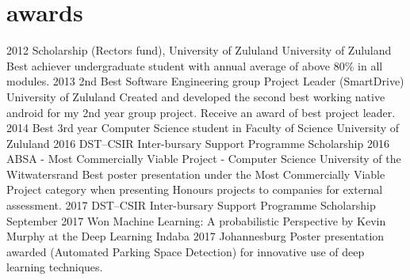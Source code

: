 \documentclass[]{friggeri-cv}
\begin{document}
\section{awards}
\begin{entrylist}
	\entry
	{2012}
	{Scholarship (Rector\textquotesingle{}s fund), University of Zululand}
	{University of Zululand}
	{Best achiever undergraduate student with annual average of above 80\% in all modules.}
	\entry
	{2013}
	{2nd Best Software Engineering group Project Leader (SmartDrive)}
	{University of Zululand}
	{Created and developed the second best working native android for my 2nd year group project. Receive an award of best project leader.}
	\entry
	{2014}
	{Best 3rd year Computer Science student in Faculty of Science}
	{University of Zululand}
	{}
	\entry
	{2016}
	{DST–CSIR Inter-bursary Support Programme Scholarship}
	{}
	{}
	\entry
	{2016}
	{ABSA - Most Commercially Viable Project - Computer Science}
	{University of the Witwatersrand}
	{Best poster presentation under the Most Commercially Viable Project category when presenting Honours projects to companies for external assessment.}
	\entry
	{2017}
	{DST–CSIR Inter-bursary Support Programme Scholarship}
	{}
	{}
	\entry
	{September 2017}
	{Won \textquotesingle{}Machine Learning: A probabilistic Perspective by Kevin Murphy\textquotesingle{} at the Deep Learning Indaba 2017}
	{Johannesburg}
	{Poster presentation awarded (Automated Parking Space Detection) for innovative use of deep learning techniques.}
\end{entrylist}
\ 
\end{document}
